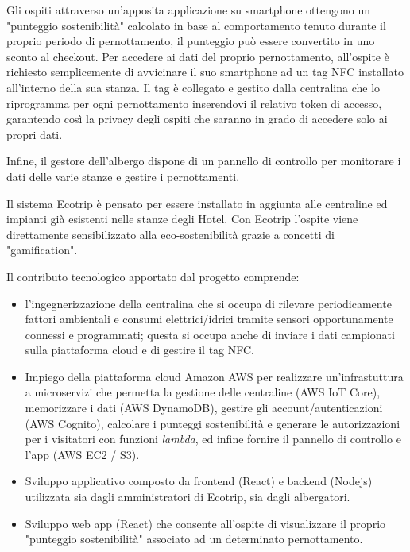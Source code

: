 Gli ospiti attraverso un'apposita applicazione su smartphone ottengono un "punteggio sostenibilità" calcolato in base al comportamento tenuto durante il proprio periodo di pernottamento, il punteggio 
può essere convertito in uno sconto al checkout. Per accedere ai dati del proprio pernottamento, all'ospite è richiesto semplicemente di avvicinare il suo smartphone ad un tag NFC installato all'interno della sua stanza.
Il tag è collegato e gestito dalla centralina che lo riprogramma per ogni pernottamento inserendovi il relativo token di accesso, garantendo così la privacy degli ospiti che saranno in grado di accedere solo ai propri dati.

Infine, il gestore dell'albergo dispone di un pannello di controllo per monitorare i dati delle varie stanze e gestire i pernottamenti.

Il sistema Ecotrip è pensato per essere installato in aggiunta alle centraline ed impianti già esistenti nelle stanze degli Hotel. 
Con Ecotrip l'ospite viene direttamente sensibilizzato alla eco-sostenibilità grazie a concetti di "gamification".


Il contributo tecnologico apportato dal progetto comprende:
\begin{itemize}
    \item l'ingegnerizzazione della centralina che si occupa di rilevare periodicamente fattori ambientali e consumi elettrici/idrici tramite sensori opportunamente connessi e programmati; questa si occupa anche di inviare i dati campionati sulla piattaforma cloud e di gestire il tag NFC. 
    \item Impiego della piattaforma cloud Amazon AWS per realizzare un'infrastuttura a microservizi che permetta la gestione delle centraline (AWS IoT Core), memorizzare i dati (AWS DynamoDB), gestire gli account/autenticazioni (AWS Cognito), calcolare i punteggi sostenibilità e generare le autorizzazioni per i visitatori con funzioni \textit{lambda}, ed infine fornire il pannello di controllo e l'app (AWS EC2 / S3).
    \item Sviluppo applicativo composto da frontend (React) e backend (Nodejs) utilizzata sia dagli amministratori di Ecotrip, sia dagli albergatori. 
    \item Sviluppo web app (React) che consente all'ospite di visualizzare il proprio "punteggio sostenibilità" associato ad un determinato pernottamento.
\end{itemize}


\newpage